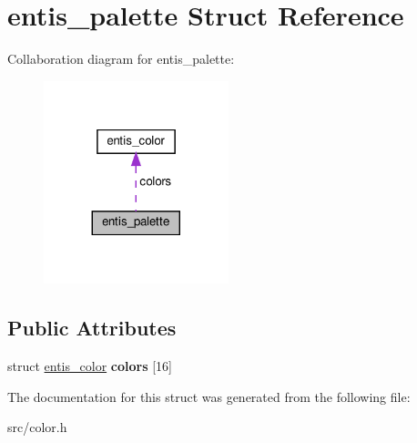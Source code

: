 \hypertarget{structentis__palette}{}\section{entis\+\_\+palette Struct Reference}
\label{structentis__palette}


Collaboration diagram for entis\+\_\+palette\+:
\nopagebreak
\begin{figure}[H]
\begin{center}
\leavevmode
\includegraphics[width=152pt]{structentis__palette__coll__graph}
\end{center}
\end{figure}
\subsection*{Public Attributes}
\begin{DoxyCompactItemize}
\item 
\mbox{\label{structentis__palette_a310189bf8fa2fd86b15cdd451a796588}} 
struct \hyperlink{structentis__color}{entis\+\_\+color} {\bfseries colors} \mbox{[}16\mbox{]}
\end{DoxyCompactItemize}


The documentation for this struct was generated from the following file\+:\begin{DoxyCompactItemize}
\item 
src/color.\+h\end{DoxyCompactItemize}
